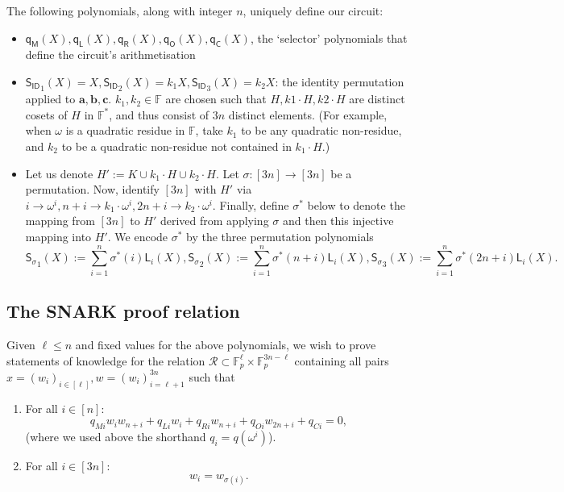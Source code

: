 \documentclass[11pt]{article} %
\newcommand{\F}{\ensuremath{\mathbb F}\xspace}
\newcommand{\defeq}{:=}
\newcommand{\sigpoly}{\ensuremath{\mathsf{S_{\sigma}}}\xspace}
\newcommand{\idpoly}{\ensuremath{\mathsf{S_{ID}}}\xspace}
\newcommand{\lvar}{\ensuremath{\mathbf{a}}\xspace}
\newcommand{\rvar}{\ensuremath{\mathbf{b}}\xspace}
\newcommand{\ovar}{\ensuremath{\mathbf{c}}\xspace}
\newcommand{\lagrangepoly}{\ensuremath{\mathsf{L}}\xspace}
\newcommand{\selmultpoly}{\ensuremath{\mathsf{q_M}}\xspace}
\newcommand{\selleftpoly}{\ensuremath{\mathsf{q_L}}\xspace}
\newcommand{\selrightpoly}{\ensuremath{\mathsf{q_R}}\xspace}
\newcommand{\seloutpoly}{\ensuremath{\mathsf{q_O}}\xspace}
\newcommand{\selconstpoly}{\ensuremath{\mathsf{q_C}}\xspace}
\newcommand{\R}{\mathcal{R}}
\newcommand{\Rsnark}{\R}
\begin{document}
The following polynomials, along with integer $n$, uniquely define our circuit:

\begin{itemize}
	\item $\selmultpoly(X), \selleftpoly(X), \selrightpoly(X), \seloutpoly(X), \selconstpoly(X)$, the `selector' polynomials that define the circuit's arithmetisation
	\item $\idpoly_1(X) = X, \idpoly_2(X) = k_1X, \idpoly_3(X) = k_2X$: the identity permutation applied to $\lvar, \rvar, \ovar$. $k_1, k_2\in \F$ are chosen such that $H,k1\cdot H,k2\cdot H$ are distinct cosets of $H$ in $\F^*$, and thus consist of $3n$ distinct elements. (For example, when $\omega$ is a quadratic residue in $\F$, take $k_1$ to be any quadratic non-residue, and $k_2$ to be a  quadratic non-residue not contained in $k_1\cdot H$.)
	\item Let us denote $H'\defeq K\cup k_1\cdot H\cup k_2\cdot H$. Let $\sigma:[3n]\to[3n]$ be a permutation. Now, identify $[3n]$ with $H'$ via $i \to \omega^i,n+i \to k_1\cdot \omega^i,2n+i \to k_2\cdot \omega^i$.  Finally, define  $\sigma^{*}$ below to denote the mapping from $[3n]$ to $H'$ derived from applying $\sigma$ and then this injective mapping into $H'$.
We encode $\sigma^*$  by the three permutation polynomials	
	\[\sigpoly_1(X) \defeq \sum_{i=1}^n \sigma^*(i) \lagrangepoly_i(X), \sigpoly_2(X) \defeq \sum_{i=1}^n \sigma^*(n + i) \lagrangepoly_i(X), \sigpoly_3(X) \defeq \sum_{i=1}^n \sigma^*(2n + i) \lagrangepoly_i(X).\]
\end{itemize}

% 
% 
\subsection{The SNARK proof relation}
Given $\ell\leq n$ and fixed values for the above polynomials, we wish to prove statements of knowledge for the relation $\Rsnark\subset \F_p^{\ell}\times \F_p^{3n-\ell}$ containing all pairs
$x=(w_i)_{i \in [\ell]}, w=(w_i)_{i=\ell+1}^{3n}$
such that
\begin{enumerate}
\item For all  $i \in [n]$:  \[q_{Mi} w_i w_{n+i} + q_{Li}w_i  + q_{Ri}w_{n+i} + q_{Oi}w_{2n+i}  + q_{Ci} = 0,\]
(where we used above the shorthand $q_i=q(\omega^i)$).
\item  For all $i \in [3n]$: \[w_i = w_{\sigma(i)}.\]
 
\end{enumerate}
\end{document}
